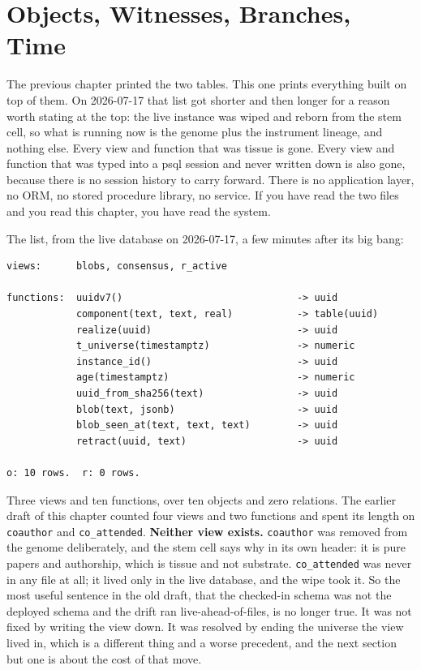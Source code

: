\chapter{Objects, Witnesses, Branches, Time}\label{ch:objects-and-witnesses}

The previous chapter printed the two tables. This one prints everything built on top of them. On 2026-07-17 that list got shorter and then longer for a reason worth stating at the top: the live instance was wiped and reborn from the stem cell, so what is running now is the genome plus the instrument lineage, and nothing else. Every view and function that was \labLineage{} tissue is gone. Every view and function that was typed into a psql session and never written down is also gone, because there is no session history to carry forward. There is no application layer, no ORM, no stored procedure library, no service. If you have read the two files and you read this chapter, you have read the system.

The list, from the live database on 2026-07-17, a few minutes after its big bang:

\begin{verbatim}
views:      blobs, consensus, r_active

functions:  uuidv7()                              -> uuid
            component(text, text, real)           -> table(uuid)
            realize(uuid)                         -> uuid
            t_universe(timestamptz)               -> numeric
            instance_id()                         -> uuid
            age(timestamptz)                      -> numeric
            uuid_from_sha256(text)                -> uuid
            blob(text, jsonb)                     -> uuid
            blob_seen_at(text, text, text)        -> uuid
            retract(uuid, text)                   -> uuid

o: 10 rows.  r: 0 rows.
\end{verbatim}

Three views and ten functions, over ten objects and zero relations. The earlier draft of this chapter counted four views and two functions and spent its length on \texttt{coauthor} and \texttt{co\_attended}. \textbf{Neither view exists.} \texttt{coauthor} was removed from the genome deliberately, and the stem cell says why in its own header: it is pure papers and authorship, which is \labLineage{} tissue and not substrate. \texttt{co\_attended} was never in any file at all; it lived only in the live database, and the wipe took it. So the most useful sentence in the old draft, that the checked-in schema was not the deployed schema and the drift ran live-ahead-of-files, is no longer true. It was not fixed by writing the view down. It was resolved by ending the universe the view lived in, which is a different thing and a worse precedent, and the next section but one is about the cost of that move.

